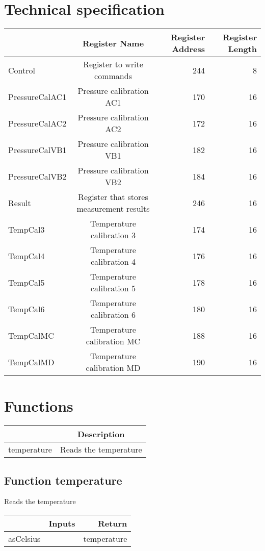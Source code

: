 \documentclass[a4paper,12pt,oneside,pdflatex,italian,final,twocolumn]{article}
\begin{document}
\section{Technical specification}
\centering
\begin{tabular}{lcrr}
\toprule
 & Register Name & Register Address & Register Length \\
\midrule
Control & Register to write commands & 244 & 8 \\
PressureCalAC1 & Pressure calibration AC1 & 170 & 16 \\
PressureCalAC2 & Pressure calibration AC2 & 172 & 16 \\
PressureCalVB1 & Pressure calibration VB1 & 182 & 16 \\
PressureCalVB2 & Pressure calibration VB2 & 184 & 16 \\
Result & Register that stores measurement results & 246 & 16 \\
TempCal3 & Temperature calibration 3 & 174 & 16 \\
TempCal4 & Temperature calibration 4 & 176 & 16 \\
TempCal5 & Temperature calibration 5 & 178 & 16 \\
TempCal6 & Temperature calibration 6 & 180 & 16 \\
TempCalMC & Temperature calibration MC & 188 & 16 \\
TempCalMD & Temperature calibration MD & 190 & 16 \\
\bottomrule
\end{tabular}


\raggedright

\section{Functions}

\centering
\begin{tabular}{lc}
\toprule
  & Description \\
\midrule
temperature & Reads the temperature \\
\bottomrule
\end{tabular}


\raggedright
\subsection{Function temperature }
Reads the temperature \\

\centering
\begin{tabular}{lcr}
\toprule
  & Inputs & Return \\
\midrule
asCelsius &
&
temperature
\\
\bottomrule
\end{tabular}



\raggedright
\end{document}
